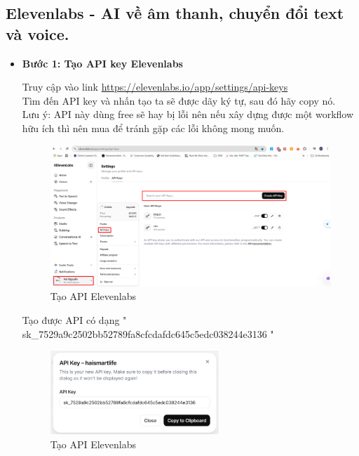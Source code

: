 \subsection{Elevenlabs - AI về âm thanh, chuyển đổi text và voice.}
\begin{itemize}[label=]
    \item \textbf{Bước 1: Tạo API key Elevenlabs} 
    
    Truy cập vào link \url{https://elevenlabs.io/app/settings/api-keys} \\ 
    
    Tìm đến API key và nhấn tạo ta sẽ được dãy ký tự, sau đó hãy copy nó.\\
    
    Lưu ý: API này dùng free sẽ hay bị lỗi nên nếu xây dựng được một workflow hữu ích thì nên mua để tránh gặp các lỗi không mong muốn.\\
    
    \begin{figure}[H]
    \centering
    \includegraphics[width=1.0\textwidth]{images/Elevenlabs.pdf}
    \caption{Tạo API Elevenlabs}
    
    \end{figure}
 Tạo được API có dạng " sk\_7529a9c2502bb52789fa8cfcdafdc645c5edc038244e3136 " \\
 
    \begin{figure}[H]
    \centering
    \includegraphics[width=0.6\textwidth]{images/Elevenlabs-1.pdf}
    \caption{Tạo API Elevenlabs}
    

\end{figure}
\end{itemize}
